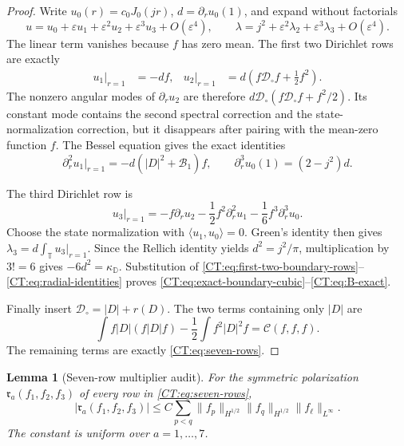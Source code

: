 \documentclass[11pt]{amsart}
\numberwithin{equation}{section}
\newtheorem{lemma}[theorem]{Lemma}
\theoremstyle{definition}
\theoremstyle{remark}
\newcommand{\T}{\mathbb T}
\newcommand{\Dop}{|D|}
\newcommand{\Cnull}{\mathcal C}
\begin{document}
\begin{proof}
Write $u_0(r)=c_0J_0(jr)$, $d=\partial_ru_0(1)$, and expand without
factorials
\begin{equation*}
 u=u_0+\varepsilon u_1+\varepsilon^2u_2+
   \varepsilon^3u_3+O(\varepsilon^4),
 \qquad
 \lambda=j^2+\varepsilon^2\lambda_2+
   \varepsilon^3\lambda_3+O(\varepsilon^4).
\end{equation*}
The linear term vanishes because $f$ has zero mean.  The first two
Dirichlet rows are exactly
\begin{align}
 u_1|_{r=1}&=-df,
 &u_2|_{r=1}
 &=d\left(f\mathcal D_\circ f+\frac12f^2\right).
 \label{CT:eq:first-two-boundary-rows}
\end{align}
The nonzero angular modes of $\partial_ru_2$ are therefore
$d\mathcal D_\circ(f\mathcal D_\circ f+f^2/2)$.  Its constant mode contains
the second spectral correction and the state-normalization correction, but
it disappears after pairing with the mean-zero function $f$.  The Bessel
equation gives the exact identities
\begin{equation}\label{CT:eq:radial-identities}
 \partial_r^2u_1|_{r=1}
 =-d(\Dop^2+\mathcal B_1)f,
 \qquad
 \partial_r^3u_0(1)=(2-j^2)d.
\end{equation}

The third Dirichlet row is
\begin{equation*}
 u_3|_{r=1}
 =-f\partial_ru_2-\frac12f^2\partial_r^2u_1
   -\frac16f^3\partial_r^3u_0.
\end{equation*}
Choose the state normalization with $\langle u_1,u_0\rangle=0$.
Green's identity then gives
$\lambda_3=d\int_\T u_3|_{r=1}$.  Since the Rellich identity yields
$d^2=j^2/\pi$, multiplication by $3!=6$ gives
$-6d^2=\kappa_{\mathbb D}$.  Substitution of
\eqref{CT:eq:first-two-boundary-rows}--\eqref{CT:eq:radial-identities} proves
\eqref{CT:eq:exact-boundary-cubic}--\eqref{CT:eq:B-exact}.

Finally insert $\mathcal D_\circ=\Dop+r(D)$.  The two terms containing
only $\Dop$ are
\begin{equation*}
 \int f\Dop(f\Dop f)-\frac12\int f^2\Dop^2f
 =\Cnull(f,f,f).
\end{equation*}
The remaining terms are exactly \eqref{CT:eq:seven-rows}.
\end{proof}

\begin{lemma}[Seven-row multiplier audit]
\label{CT:lem:seven-row-audit}
For the symmetric polarization $\mathfrak r_a(f_1,f_2,f_3)$ of every row
in \eqref{CT:eq:seven-rows},
\begin{equation}\label{CT:eq:seven-row-estimate}
 |\mathfrak r_a(f_1,f_2,f_3)|
 \le C\sum_{p<q}\|f_p\|_{H^{1/2}}
                    \|f_q\|_{H^{1/2}}
                    \|f_\ell\|_{L^\infty}.
\end{equation}
The constant is uniform over $a=1,\ldots,7$.
\end{lemma}
\end{document}
